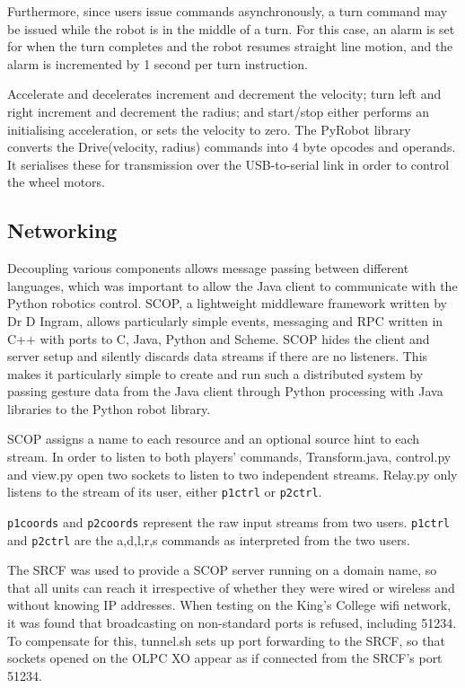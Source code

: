 \documentclass[12pt,a4,notitlepage]{report}
\renewcommand{\_}{\texttt{\symbol{95}}}
\newcommand{\<}{\texttt{\symbol{60}}}
\renewcommand{\>}{\texttt{\symbol{62}}}
\newcommand{\scopendpoint}[1]{\texttt{#1}}
\begin{document}
{Furthermore, since users issue commands asynchronously, a turn command may be issued while the robot is in the middle of a turn. For this case, an alarm is set for when the turn completes and the robot resumes straight line motion, and the alarm is incremented by 1 second per turn instruction. 

Accelerate and decelerates increment and decrement the velocity; turn left and right increment and decrement the radius; and start/stop either performs an initialising acceleration, or sets the velocity to zero. The PyRobot library converts the Drive(velocity, radius) commands into 4 byte opcodes and operands. It serialises these for transmission over the USB-to-serial link in order to control the wheel motors.

\subsection{Networking}

Decoupling various components allows message passing between different languages, which was important to allow the Java client to communicate with the Python robotics control. SCOP, a lightweight middleware framework written by Dr D Ingram, allows particularly simple events, messaging and RPC written in C++ with ports to C, Java, Python and Scheme. SCOP hides the client and server setup and silently discards data streams if there are no listeners. This makes it particularly simple to create and run such a distributed system by passing gesture data from the Java client through Python processing with Java libraries to the Python robot library.

SCOP assigns a name to each resource and an optional source hint to each stream. In order to listen to both players' commands, Transform.java, control.py and view.py open two sockets to listen to two independent streams. Relay.py only listens to the stream of its user, either \scopendpoint{p1ctrl} or \scopendpoint{p2ctrl}.

\scopendpoint{p1coords} and \scopendpoint{p2coords} represent the raw input streams from two users.
\scopendpoint{p1ctrl} and \scopendpoint{p2ctrl} are the {a,d,l,r,s} commands as interpreted from the two users.

The SRCF was used to provide a SCOP server running on a domain name, so that all units can reach it irrespective of whether they were wired or wireless and without knowing IP addresses. When testing on the King's College wifi network, it was found that broadcasting on non-standard ports is refused, including 51234. To compensate for this, tunnel.sh sets up port forwarding to the SRCF, so that sockets opened on the OLPC XO appear as if connected from the SRCF's port 51234.

}
\end{document}
